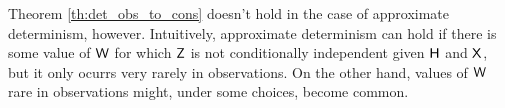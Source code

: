 


Theorem \ref{th:det_obs_to_cons} doesn't hold in the case of approximate determinism, however. Intuitively, approximate determinism can hold if there is some value of $\mathsf{W}$ for which $\mathsf{Z}$ is not conditionally independent given $\mathsf{H}$ and $\mathsf{X}$, but it only ocurrs very rarely in observations. On the other hand, values of $\mathsf{W}$ rare in observations might, under some choices, become common. 

